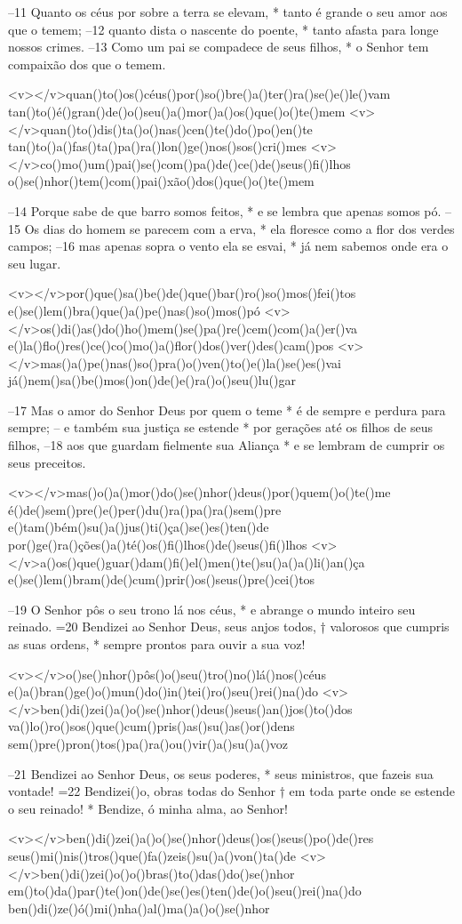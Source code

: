–11 Quanto os céus por sobre a terra se elevam, *
tanto é grande o seu amor aos que o temem;
–12 quanto dista o nascente do poente, *
tanto afasta para longe nossos crimes.
–13 Como um pai se compadece de seus filhos, *
o Senhor tem compaixão dos que o temem.

<v></v>quan()to()os()céus()por()so()bre()a()ter()ra()se()e()le()vam
tan()to()é()gran()de()o()seu()a()mor()a()os()que()o()te()mem
<v></v>quan()to()dis()ta()o()nas()cen()te()do()po()en()te
tan()to()a()fas()ta()pa()ra()lon()ge()nos()sos()cri()mes
<v></v>co()mo()um()pai()se()com()pa()de()ce()de()seus()fi()lhos
o()se()nhor()tem()com()pai()xão()dos()que()o()te()mem

–14 Porque sabe de que barro somos feitos, *
e se lembra que apenas somos pó.
–15 Os dias do homem se parecem com a erva, *
ela floresce como a flor dos verdes campos;
–16 mas apenas sopra o vento ela se esvai, *
já nem sabemos onde era o seu lugar.

<v></v>por()que()sa()be()de()que()bar()ro()so()mos()fei()tos
e()se()lem()bra()que()a()pe()nas()so()mos()pó
<v></v>os()di()as()do()ho()mem()se()pa()re()cem()com()a()er()va
e()la()flo()res()ce()co()mo()a()flor()dos()ver()des()cam()pos
<v></v>mas()a()pe()nas()so()pra()o()ven()to()e()la()se()es()vai
já()nem()sa()be()mos()on()de()e()ra()o()seu()lu()gar

–17 Mas o amor do Senhor Deus por quem o teme *
é de sempre e perdura para sempre;
– e também sua justiça se estende *
por gerações até os filhos de seus filhos,
–18 aos que guardam fielmente sua Aliança *
e se lembram de cumprir os seus preceitos.

<v></v>mas()o()a()mor()do()se()nhor()deus()por()quem()o()te()me
é()de()sem()pre()e()per()du()ra()pa()ra()sem()pre
e()tam()bém()su()a()jus()ti()ça()se()es()ten()de
por()ge()ra()ções()a()té()os()fi()lhos()de()seus()fi()lhos
<v></v>a()os()que()guar()dam()fi()el()men()te()su()a()a()li()an()ça
e()se()lem()bram()de()cum()prir()os()seus()pre()cei()tos

–19 O Senhor pôs o seu trono lá nos céus, *
e abrange o mundo inteiro seu reinado.
=20 Bendizei ao Senhor Deus, seus anjos todos, †
valorosos que cumpris as suas ordens, *
sempre prontos para ouvir a sua voz!

<v></v>o()se()nhor()pôs()o()seu()tro()no()lá()nos()céus
e()a()bran()ge()o()mun()do()in()tei()ro()seu()rei()na()do
<v></v>ben()di()zei()a()o()se()nhor()deus()seus()an()jos()to()dos
va()lo()ro()sos()que()cum()pris()as()su()as()or()dens
sem()pre()pron()tos()pa()ra()ou()vir()a()su()a()voz

–21 Bendizei ao Senhor Deus, os seus poderes, *
seus ministros, que fazeis sua vontade!
=22 Bendizei()o, obras todas do Senhor †
em toda parte onde se estende o seu reinado! *
Bendize, ó minha alma, ao Senhor!

<v></v>ben()di()zei()a()o()se()nhor()deus()os()seus()po()de()res
seus()mi()nis()tros()que()fa()zeis()su()a()von()ta()de
<v></v>ben()di()zei()o()o()bras()to()das()do()se()nhor
em()to()da()par()te()on()de()se()es()ten()de()o()seu()rei()na()do
ben()di()ze()ó()mi()nha()al()ma()a()o()se()nhor